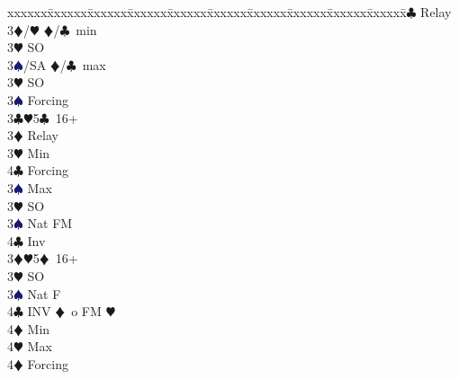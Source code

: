 \documentclass[a4paper,italian]{article}
\newcommand{\BC}{\textcolor{OliveGreen}{$\clubsuit$}}
\newcommand{\BD}{\textcolor{RedOrange}{$\vardiamondsuit$}}
\newcommand{\BH}{\textcolor{Red2}{$\varheartsuit${}}}
\newcommand{\BS}{\textcolor{MidnightBlue}{$\spadesuit${}}}
\newenvironment{bidtable}
{\begin{tabbing}

    xxxxxx\=xxxxxx\=xxxxxx\=xxxxxx\=xxxxxx\=xxxxxx\=xxxxxx\=xxxxxx\=xxxxxx\=xxxxxx\=\kill}
{\end{tabbing} }%
\begin{document}
\begin{multicols*}{2}
\begin{bidtable}
                                            3\BC \> Relay\+\\
                                            3\BD/\BH \> \BD /\BC\ min\+\\
                                            3\BH \> SO\-\\
                                            3\BS/SA \> \BD /\BC\ max\-\\
                                            3\BH \> SO\\
                                            3\BS \> Forcing\-\\
                                            3\BC {}\BH 5\BC\ 16+\+\\
                                            3\BD \> Relay\+\\
                                            3\BH \> Min\+\\
                                            4\BC \> Forcing\-\\
                                            3\BS \> Max\-\\
                                            3\BH \> SO\\
                                            3\BS \> Nat FM\\
                                            4\BC \> Inv\-\\
                                            3\BD {}\BH 5\BD\ 16+\+\\
                                            3\BH \> SO\\
                                            3\BS \> Nat F\\
                                            4\BC \> INV \BD\ o FM \BH \+\\
                                            4\BD \> Min\\
                                            4\BH \> Max\-\\
                                            4\BD \> Forcing\-\-
                                        \end{bidtable}


\end{multicols*}
\end{document}
